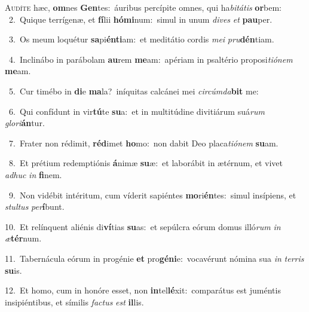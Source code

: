 \lettrine{\initial\textcolor{\initialcolor}{A}}{udíte} hæc, \textbf{om}\-nes \textbf{Gen}\-tes:~\star áuribus percípite omnes, qui ha\-\textit{bi}\-\textit{tá}\textit{tis} \textbf{or}\-bem:\\
{\numbfont\textcolor{\numbcolor}{~2.}}~Quique terrígenæ, et \textbf{fí}\-lii \textbf{hó}\-\textbf{mi}num:~\star simul in unum \textit{di}\-\textit{ves} \textit{et} \textbf{pau}\-per.\par
{\numbfont\textcolor{\numbcolor}{~3.}}~Os meum loquétur \textbf{sa}\-pi\-\textbf{én}\-\textbf{ti}am:~\star et meditátio cordis \textit{me}\-\textit{i} \textit{pru}\-\textbf{dén}tiam.\par
{\numbfont\textcolor{\numbcolor}{~4.}}~Inclinábo in parábolam \textbf{au}\-rem \textbf{me}\-am:~\star apériam in psaltério proposi\-\textit{ti}\-\textit{ó}\textit{nem} \textbf{me}\-am.\par
{\numbfont\textcolor{\numbcolor}{~5.}}~Cur timébo in \textbf{di}\-e \textbf{ma}\-la?~\star iníquitas calcánei mei \textit{cir}\-\textit{cúm}\textit{da}\textbf{bit} me:\par
{\numbfont\textcolor{\numbcolor}{~6.}}~Qui confídunt in vir\-\textbf{tú}\-te \textbf{su}\-a:~\star et in multitúdine divitiárum suá\textit{rum} \textit{glo}\-\textit{ri}\textbf{án}tur.\par
{\numbfont\textcolor{\numbcolor}{~7.}}~Frater non rédimit, \textbf{réd}\-imet \textbf{ho}\-mo:~\star non dabit Deo placa\-\textit{ti}\-\textit{ó}\textit{nem} \textbf{su}\-am.\par
{\numbfont\textcolor{\numbcolor}{~8.}}~Et prétium redemptiónis \textbf{á}\-nimæ \textbf{su}\-æ:~\star et laborábit in ætérnum, et vivet \textit{ad}\-\textit{huc} \textit{in} \textbf{fi}\-nem.\par
{\numbfont\textcolor{\numbcolor}{~9.}}~Non vidébit intéritum, cum víderit sapiéntes \textbf{mo}\-ri\-\textbf{én}\-tes:~\star simul insípiens, et \textit{stul}\-\textit{tus} \textit{per}\-\textbf{í}bunt.\par
{\numbfont\textcolor{\numbcolor}{10.}}~Et relínquent aliénis di\-\textbf{ví}\-tias \textbf{su}\-as:~\star et sepúlcra eórum domus illó\textit{rum} \textit{in} \textit{æ}\-\textbf{tér}num.\par
{\numbfont\textcolor{\numbcolor}{11.}}~Tabernácula eórum in progénie \textbf{et} pro\-\textbf{gé}\-\textbf{ni}e:~\star vocavérunt nómina sua \textit{in} \textit{ter}\-\textit{ris} \textbf{su}\-is.\par
{\numbfont\textcolor{\numbcolor}{12.}}~Et homo, cum in honóre esset, non \textbf{in}\-tel\-\textbf{lé}\-xit:~\star comparátus est juméntis insipiéntibus, et símilis \textit{fac}\-\textit{tus} \textit{est} \textbf{il}\-lis.\par
